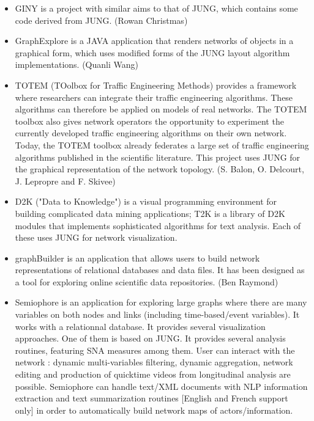\documentclass[a4paper,oneside]{article}
\begin{document}
\begin{enumerate}
\begin{itemize}
\item GINY is a project with similar aims to that of JUNG, which contains some code derived from JUNG. (Rowan Christmas)~\cite{GINY}

\item GraphExplore is a JAVA application that renders networks of objects in a graphical form, which uses modified forms of the JUNG layout algorithm implementations. (Quanli Wang)~\cite{GRAPHEXPLORER}

\item TOTEM (TOolbox for Traffic Engineering Methods) provides a framework where researchers can integrate their traffic engineering algorithms. These algorithms can therefore be applied on models of real networks. The TOTEM toolbox also gives network operators the opportunity to experiment the currently developed traffic engineering algorithms on their own network. Today, the TOTEM toolbox already federates a large set of traffic engineering algorithms published in the scientific literature. This project uses JUNG for the graphical representation of the network topology. (S. Balon, O. Delcourt, J. Lepropre and F. Skivee)~\cite{TOTEM}

\item D2K ("Data to Knowledge") is a visual programming environment for building complicated data mining applications; T2K is a library of D2K modules that implements sophisticated algorithms for text analysis. Each of these uses JUNG for network visualization.~\cite{D2K}

\item graphBuilder is an application that allows users to build network representations of relational databases and data files. It has been designed as a tool for exploring online scientific data repositories. (Ben Raymond)~\cite{GRAPHBUILDER}

\item Semiophore is an application for exploring large graphs where there are many variables on both nodes and links (including time-based/event variables). It works with a relationnal database. It provides several visualization approaches. One of them is based on JUNG. It provides several analysis routines, featuring SNA measures among them. User can interact with the network : dynamic multi-variables filtering, dynamic aggregation, network editing and production of quicktime videos from longitudinal analysis are possible. Semiophore can handle text/XML documents with NLP information extraction and text summarization routines [English and French support only] in order to automatically build network maps of actors/information.~\cite{SEMIOPHORE}


\end{itemize}
\end{enumerate}
\end{document}
